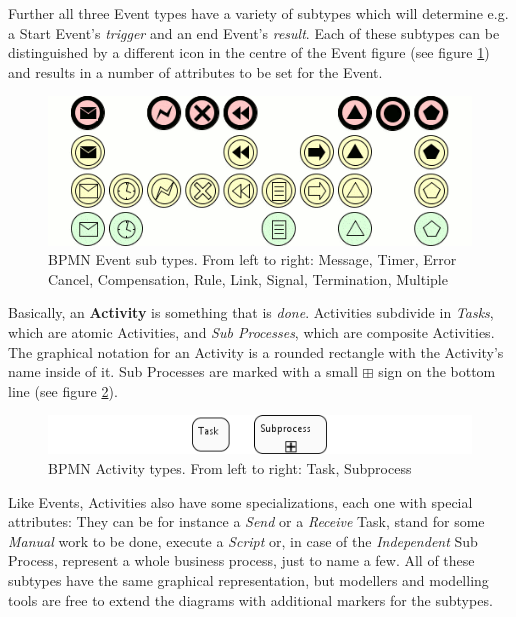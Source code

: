 Further all three Event types have a variety of subtypes which will determine e.g. a Start Event's
\emph{trigger} and an end Event's \emph{result}. Each of these subtypes can be distinguished by a
different icon in the centre of the Event figure (see figure \ref{fig:triggers}) and results in a
number of attributes to be set for the Event.

\begin{figure}[ht]
	\centering
	\includegraphics[width=.75\textwidth]{figures/bpmn/triggers.png}
	\caption[BPMN Event sub types]{BPMN Event sub types. From left to right: Message, Timer, Error
	Cancel, Compensation, Rule, Link, Signal, Termination, Multiple}
	\label{fig:triggers}
\end{figure}

Basically, an \textbf{Activity} is something that is \emph{done}. Activities subdivide in
\emph{Tasks}, which are atomic Activities, and \emph{Sub Processes}, which are composite Activities.
The graphical notation for an Activity is a rounded rectangle with the Activity's name inside of it.
Sub Processes are marked with a small $ \boxplus $ sign on the bottom line (see figure
\ref{fig:activities}).

\begin{figure}[ht]
	\centering
	\includegraphics[width=.75\textwidth]{figures/bpmn/activities.png}
	\caption[BPMN Activity types]{BPMN Activity types. From left to right: Task, Subprocess}
	\label{fig:activities}
\end{figure}

Like Events, Activities also have some specializations, each one with special attributes: They can
be for instance a \emph{Send} or a \emph{Receive} Task, stand for some \emph{Manual} work to be
done, execute a \emph{Script} or, in case of the \emph{Independent} Sub Process, represent a whole
business process, just to name a few. All of these subtypes have the same graphical representation,
but modellers and modelling tools are free to extend the diagrams with additional markers for the
subtypes.

